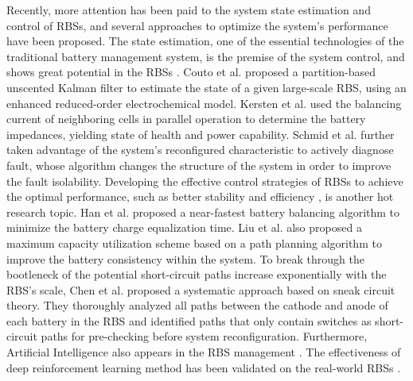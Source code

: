 \documentclass{article}
\begin{document}
Recently, more attention has been paid to the system state estimation and control of RBSs, and several approaches to optimize the system's performance have been proposed.
The state estimation, one of the essential technologies of the traditional battery management system, is the premise of the system control, and shows great potential in the RBSs \cite{komsiyskaCriticalReviewIntelligent2021}.
Couto et al. \cite{coutoPartitionbasedUnscentedKalman2018a} proposed a partition-based unscented Kalman filter to estimate the state of a given large-scale RBS, using an enhanced reduced-order electrochemical model.
Kersten et al. \cite{kerstenOnlineOnBoardBattery2020a} used the balancing current of neighboring cells in parallel operation to determine the battery impedances, yielding state of health and power capability.
Schmid et al. \cite{schmidActiveModelBasedFault2021a} further taken advantage of the system's reconfigured characteristic to actively diagnose fault, whose algorithm changes the structure of the system in order to improve the fault isolability. 
Developing the effective control strategies of RBSs to achieve the optimal performance, such as better stability \cite{kacetlDesignAnalysisModular2023b} and efficiency \cite{yangAdaptiveControlFramework2022}, is another hot research topic.
Han et al. \cite{hanNearFastestBatteryBalancing2019a} proposed a near-fastest battery balancing algorithm to minimize the battery charge equalization time.
Liu et al. \cite{liuFlexiblePathPlanningbased2023a} also proposed a maximum capacity utilization scheme based on a path planning algorithm to improve the battery consistency within the system.
To break through the bootleneck of the potential short-circuit paths increase exponentially with the RBS's scale, Chen et al. \cite{chenSneakCircuitTheory2021} proposed a systematic approach based on sneak circuit theory. 
They thoroughly analyzed all paths between the cathode and anode of each battery in the RBS and identified paths that only contain switches as short-circuit paths for pre-checking before system reconfiguration. 
Furthermore, Artificial Intelligence also appears in the RBS management \cite{liuLongLifetimeBattery2022a}.
The effectiveness of deep reinforcement learning method has been validated on the real-world RBSs \cite{yangAdaptiveControlFramework2022}.
\end{document}
